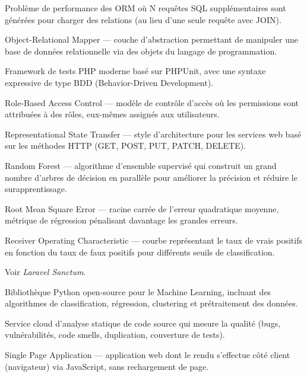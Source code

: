 \begin{description}[leftmargin=4cm, style=nextline]
  \item[N+1]
  Problème de performance des ORM où N requêtes SQL supplémentaires sont générées
  pour charger des relations (au lieu d'une seule requête avec JOIN).

  \item[ORM]
  Object-Relational Mapper — couche d'abstraction permettant de manipuler une
  base de données relationnelle via des objets du langage de programmation.

  \item[PestPHP]
  Framework de tests PHP moderne basé sur PHPUnit, avec une syntaxe expressive
  de type BDD (Behavior-Driven Development).

  \item[RBAC]
  Role-Based Access Control — modèle de contrôle d'accès où les permissions
  sont attribuées à des rôles, eux-mêmes assignés aux utilisateurs.

  \item[REST]
  Representational State Transfer — style d'architecture pour les services web
  basé sur les méthodes HTTP (GET, POST, PUT, PATCH, DELETE).

  \item[RF]
  Random Forest — algorithme d'ensemble supervisé qui construit un grand nombre
  d'arbres de décision en parallèle pour améliorer la précision et réduire le
  surapprentissage.

  \item[RMSE]
  Root Mean Square Error — racine carrée de l'erreur quadratique moyenne, métrique
  de régression pénalisant davantage les grandes erreurs.

  \item[ROC]
  Receiver Operating Characteristic — courbe représentant le taux de vrais positifs
  en fonction du taux de faux positifs pour différents seuils de classification.

  \item[Sanctum]
  Voir \textit{Laravel Sanctum}.

  \item[Scikit-learn]
  Bibliothèque Python open-source pour le Machine Learning, incluant des algorithmes
  de classification, régression, clustering et prétraitement des données.

  \item[SonarCloud]
  Service cloud d'analyse statique de code source qui mesure la qualité (bugs,
  vulnérabilités, code smells, duplication, couverture de tests).

  \item[SPA]
  Single Page Application — application web dont le rendu s'effectue côté client
  (navigateur) via JavaScript, sans rechargement de page.


\end{description}
